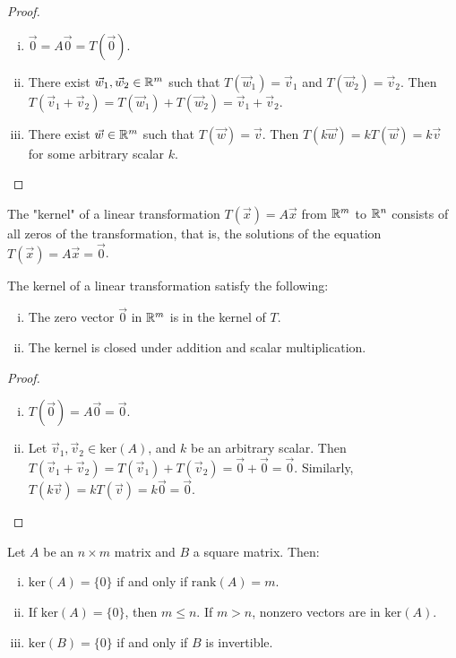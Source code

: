 \documentclass[a4paper,11pt]{article}
\begin{document}
\begin{outline}
    \begin{proof}
      \begin{enumerate}[i.]
        \item
          \(\vec{0} = A\vec{0} = T(\vec{0})\).
        \item
          There exist \(\vec{w}_1, \vec{w}_2 \in \mathbb{R}^m\) such that \(T(\vec{w}_1) = \vec{v}_1\) and
          \(T(\vec{w}_2) = \vec{v}_2\). Then \(T(\vec{v}_1 + \vec{v}_2) = T(\vec{w}_1) + T(\vec{w}_2) =
          \vec{v}_1 + \vec{v}_2\).
        \item
          There exist \(\vec{w} \in \mathbb{R}^m\) such that \(T(\vec{w}) = \vec{v}\). Then \(T(k\vec{w}) =
          kT(\vec{w}) = k\vec{v}\) for some arbitrary scalar \(k\).
      \end{enumerate}
    \end{proof}

    The "kernel" of a linear transformation \(T(\vec{x}) = A\vec{x}\) from \(\mathbb{R}^m\) to \(\mathbb{R}^n\)
    consists of all zeros of the transformation, that is, the solutions of the equation \(T(\vec{x}) = A\vec{x}
    = \vec{0}\).

    The kernel of a linear transformation satisfy the following:
    \begin{enumerate}[i.]
      \item
        The zero vector \(\vec{0}\) in \(\mathbb{R}^m\) is in the kernel of \(T\).
      \item
        The kernel is closed under addition and scalar multiplication.
    \end{enumerate}

    \begin{proof}
      \begin{enumerate}[i.]
        \item
          \(T(\vec{0}) = A\vec{0} = \vec{0}\).
        \item
          Let \(\vec{v}_1, \vec{v}_2 \in \text{ker}(A)\), and \(k\) be an arbitrary scalar. Then \(T(\vec{v}_1
          + \vec{v}_2) = T(\vec{v}_1) + T(\vec{v}_2) = \vec{0} + \vec{0} = \vec{0}\). Similarly, \(T(k\vec{v})
          = kT(\vec{v}) = k\vec{0} = \vec{0}\).
      \end{enumerate}
    \end{proof}

    Let \(A\) be an \(n \times m\) matrix and \(B\) a square matrix. Then:
    \begin{enumerate}[i.]
      \item \(\text{ker}(A) = \{0\}\) if and only if \(\text{rank}(A) = m\).
      \item If \(\text{ker}(A) = \{0\}\), then \(m \leq n\). If \(m > n\), nonzero vectors are in \(\text{ker}(A)\).
      \item \(\text{ker}(B) = \{0\}\) if and only if \(B\) is invertible.
    \end{enumerate}



\end{outline}
\end{document}
